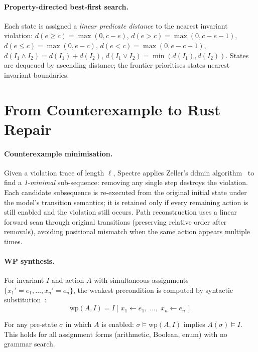 \documentclass[runningheads]{../paper-vmcai-2027/llncs}
\begin{document}
\paragraph{Property-directed best-first search.}
Each state is assigned a \emph{linear predicate distance} to the nearest
invariant violation:
$d(e\ge c)=\max(0,c-e)$, $d(e>c)=\max(0,c-e-1)$,
$d(e\le c)=\max(0,e-c)$, $d(e<c)=\max(0,e-c-1)$,
$d(I_1\wedge I_2)=d(I_1)+d(I_2)$, $d(I_1\vee I_2)=\min(d(I_1),d(I_2))$.
States are dequeued by ascending distance; the frontier prioritises states
nearest invariant boundaries.

\section{From Counterexample to Rust Repair}\label{sec:repair}

\paragraph{Counterexample minimisation.}
Given a violation trace of length $\ell$, Spectre applies Zeller's ddmin
algorithm~\cite{26_zeller2002simplifying} to find a \emph{1-minimal}
sub-sequence: removing any single step destroys the violation.
Each candidate subsequence is re-executed from the original initial state
under the model's transition semantics; it is retained only if every remaining
action is still enabled and the violation still occurs.
Path reconstruction uses a linear forward scan through original transitions
(preserving relative order after removals), avoiding positional mismatch
when the same action appears multiple times.

\paragraph{WP synthesis.}
For invariant $I$ and action $A$ with simultaneous assignments
$\{x_1'=e_1,\ldots,x_n'=e_n\}$, the weakest precondition is computed
by syntactic substitution~\cite{7_dijkstra1976discipline}:
\[
\mathrm{wp}(A,I)=I[\,x_1\leftarrow e_1,\;\ldots,\;x_n\leftarrow e_n\,]
\]

\begin{proposition}\label{prop:wp}
For any pre-state $\sigma$ in which $A$ is enabled:
$\sigma\models\mathrm{wp}(A,I)$ implies $A(\sigma)\models I$.
This holds for all assignment forms (arithmetic, Boolean, enum) with no
grammar search.
\end{proposition}
\end{document}
